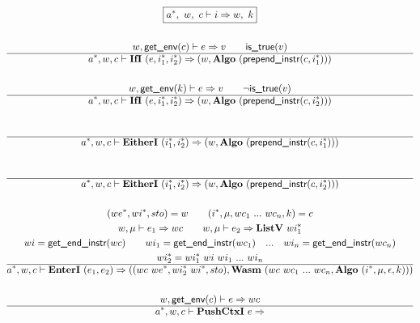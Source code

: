 \begin{gather*}
  \boxed{\seq{a}, ~ w, ~ c \vdash i \Rightarrow w, ~ k} \\
%
\newline \\
  w, \getenv(c) \vdash e \Rightarrow v \qquad
  \istrue(v) \\
  \hline
  \seq{a}, w, c \vdash \ifi ~ (e, \seq{i_1}, \seq{i_2}) \Rightarrow
  (w, \algo ~ (\prependinstr(c, \seq{i_1}))) \\
%
\newline \\
  w, \getenv(k) \vdash e \Rightarrow v \qquad
  \neg \istrue(v) \\
  \hline
  \seq{a}, w, c \vdash \ifi ~ (e, \seq{i_1}, \seq{i_2}) \Rightarrow
  (w, \algo ~ (\prependinstr(c, \seq{i_2}))) \\
%
\newline \\
  \\
  \hline
  \seq{a}, w, c \vdash \eitheri ~ (\seq{i_1}, \seq{i_2}) \Rightarrow
  (w, \algo ~ (\prependinstr(c, \seq{i_1}))) \\
%
\newline \\
  \\
  \hline
  \seq{a}, w, c \vdash \eitheri ~ (\seq{i_1}, \seq{i_2}) \Rightarrow
  (w, \algo ~ (\prependinstr(c, \seq{i_2}))) \\
%
\newline \\
  (\seq{we}, \seq{wi}, sto) = w \qquad
  (i^*, \mu, wc_1 ~ ... ~ wc_n, k) = c \\
  w, \mu \vdash e_1 \Rightarrow wc \qquad
  w, \mu \vdash e_2 \Rightarrow \listv ~ \seq{wi_1} \\
  wi = \getendinstr(wc) \qquad
  wi_1 = \getendinstr(wc_1) \quad ... \quad wi_n = \getendinstr(wc_n) \\
  wi_2^* = wi_1^* ~ wi ~ wi_1 ~ ... ~ wi_n \\
  \hline
  \seq{a}, w, c \vdash \enteri ~ (e_1, e_2)
  \Rightarrow
  (
    (wc ~ \seq{we}, wi_2^* ~ \seq{wi}, sto),
    \wasm ~ (wc ~ wc_1 ~ ... ~ wc_n, \algo ~ (i^*, \mu, \epsilon, k))
  ) \\
%
\newline \\
  w, \getenv(c) \vdash e \Rightarrow wc \\
  \hline
  \seq{a}, w, c \vdash \pushctxi ~ e
  \Rightarrow

\end{gather*}

